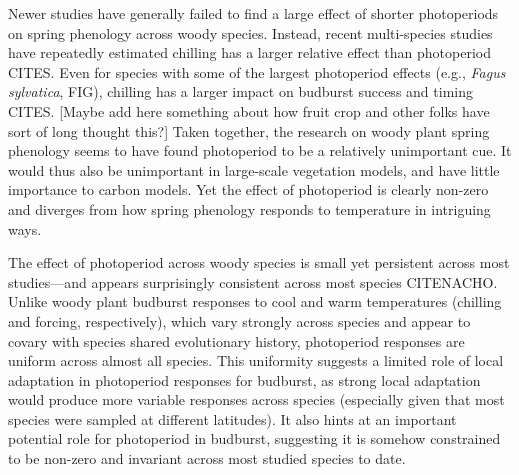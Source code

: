 \documentclass[11pt]{article}
\begin{document}
Newer studies have generally failed to find a large effect of shorter photoperiods on spring phenology across woody species. Instead, recent multi-species studies have repeatedly estimated chilling has a larger relative effect than photoperiod CITES. Even for species with some of the largest photoperiod effects (e.g., \emph{Fagus sylvatica}, FIG), chilling has a larger impact on budburst success and timing CITES. [Maybe add here something about how fruit crop and other folks have sort of long thought this?] Taken together, the research on woody plant spring phenology seems to have found photoperiod to be a relatively unimportant cue. It would thus also be unimportant in large-scale vegetation models, and have little importance to carbon models. Yet the effect of photoperiod is clearly non-zero and diverges from how spring phenology responds to temperature in intriguing ways. 

The effect of photoperiod across woody species is small yet persistent across most studies---and appears surprisingly consistent across most species CITENACHO. Unlike woody plant budburst responses to cool and warm temperatures (chilling and forcing, respectively), which vary strongly across species and appear to covary with species shared evolutionary history, photoperiod responses are uniform across almost all species. This uniformity suggests a limited role of local adaptation in photoperiod responses for budburst, as strong local adaptation would produce more variable responses across species (especially given that most species were sampled at different latitudes).  It also hints at an important potential role for photoperiod in budburst, suggesting it is somehow constrained to be non-zero and invariant across most studied species to date. 
\end{document}
